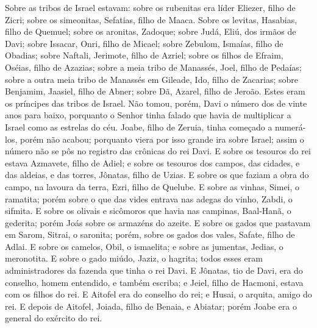 Sobre as tribos de Israel estavam: sobre os rubenitas era líder
Eliezer, filho de Zicri; sobre os simeonitas, Sefatias, filho de
Maaca. Sobre os levitas, Hasabias, filho de Quemuel; sobre os
aronitas, Zadoque; sobre Judá, Eliú, dos irmãos de Davi;
sobre Issacar, Onri, filho de Micael; sobre Zebulom, Ismaías,
filho de Obadias; sobre Naftali, Jerimote, filho de Azriel;
sobre os filhos de Efraim, Oséias, filho de Azazias; sobre a
meia tribo de Manassés, Joel, filho de Pedaías; sobre a outra
meia tribo de Manassés em Gileade, Ido, filho de Zacarias; sobre
Benjamim, Jaasiel, filho de Abner; sobre Dã, Azarel, filho de
Jeroão. Estes eram os príncipes das tribos de Israel. Não
tomou, porém, Davi o número dos de vinte anos para baixo, porquanto
o Senhor tinha falado que havia de multiplicar a Israel como as
estrelas do céu. Joabe, filho de Zeruia, tinha começado a
numerá-los, porém não acabou; porquanto viera por isso grande ira
sobre Israel; assim o número não se pôs no registro das crônicas do
rei Davi. E sobre os tesouros do rei estava Azmavete, filho
de Adiel; e sobre os tesouros dos campos, das cidades, e das
aldeias, e das torres, Jônatas, filho de Uzias. E sobre os
que faziam a obra do campo, na lavoura da terra, Ezri, filho de
Quelube. E sobre as vinhas, Simei, o ramatita; porém sobre o
que das vides entrava nas adegas do vinho, Zabdi, o sifmita.
E sobre os olivais e sicômoros que havia nas campinas,
Baal-Hanã, o gederita; porém Joás sobre os armazéns do azeite.
E sobre os gados que pastavam em Sarom, Sitrai, o saronita;
porém, sobre os gados dos vales, Safate, filho de Adlai. E
sobre os camelos, Obil, o ismaelita; e sobre as jumentas, Jedias, o
meronotita. E sobre o gado miúdo, Jaziz, o hagrita; todos
esses eram administradores da fazenda que tinha o rei Davi. E
Jônatas, tio de Davi, era do conselho, homem entendido, e também
escriba; e Jeiel, filho de Hacmoni, estava com os filhos do rei.
E Aitofel era do conselho do rei; e Husai, o arquita, amigo
do rei. E depois de Aitofel, Joiada, filho de Benaia, e
Abiatar; porém Joabe era o general do exército do rei.

\medskip

